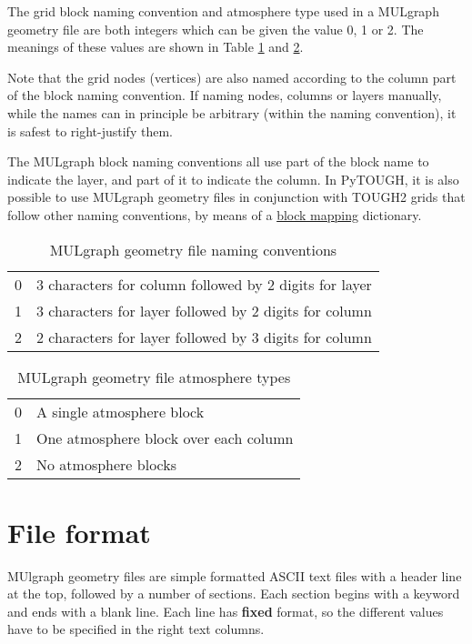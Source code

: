 The grid block naming convention and atmosphere type used in a MULgraph geometry file are both integers which can be given the value 0, 1 or 2.  The meanings of these values are shown in Table \ref{tb:mulgrid_conventions} and \ref{tb:mulgrid_atmosphere_types}.

Note that the grid nodes (vertices) are also named according to the column part of the block naming convention. If naming nodes, columns or layers manually, while the names can in principle be arbitrary (within the naming convention), it is safest to right-justify them.

The MULgraph block naming conventions all use part of the block name to indicate the layer, and part of it to indicate the column. In PyTOUGH, it is also possible to use MULgraph geometry files in conjunction with TOUGH2 grids that follow other naming conventions, by means of a \hyperref[sec:mulgrid:blockmappings]{block mapping} dictionary.

\begin{table}[h]
  \begin{center}
    \begin{tabular}{|l|p{85mm}|}
      \hline
      0 & 3 characters for column followed by 2 digits for layer \\
      1 & 3 characters for layer followed by 2 digits for column \\
      2 & 2 characters for layer followed by 3 digits for column \\
      \hline
    \end{tabular}
    \caption{MULgraph geometry file naming conventions}
    \label{tb:mulgrid_conventions}
  \end{center}
\end{table}

\begin{table}[h]
  \begin{center}
    \begin{tabular}{|l|p{85mm}|}
      \hline
      0 & A single atmosphere block \\
      1 & One atmosphere block over each column \\
      2 & No atmosphere blocks \\
      \hline
    \end{tabular}
    \caption{MULgraph geometry file atmosphere types}
    \label{tb:mulgrid_atmosphere_types}
  \end{center}
\end{table}

\section{File format}
MUlgraph geometry files are simple formatted ASCII text files with a header line at the top, followed by a number of sections. Each section begins with a keyword and ends with a blank line. Each line has \textbf{fixed} format, so the different values have to be specified in the right text columns.


